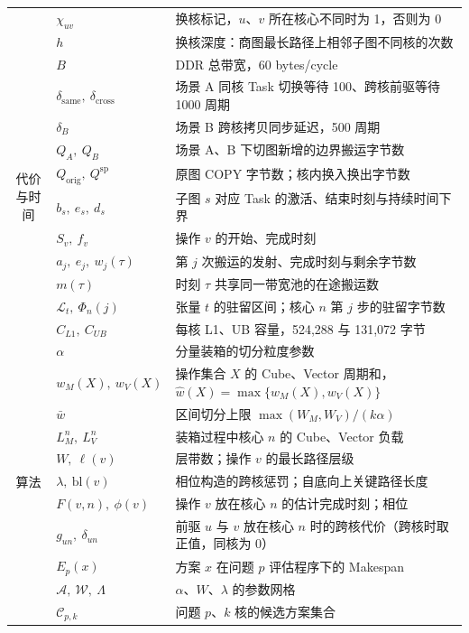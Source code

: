 \begin{footnotesize}
\begin{longtable}{c p{3.3cm} p{9.6cm}}
 & $\chi_{uv}$ & 换核标记，$u$、$v$ 所在核心不同时为 1，否则为 0 \\
 & $h$ & 换核深度：商图最长路径上相邻子图不同核的次数 \\
\midrule
\multirow{11}{*}{代价与时间}
 & $B$ & DDR 总带宽，60 bytes/cycle \\
 & $\delta_{\mathrm{same}},\ \delta_{\mathrm{cross}}$ & 场景 A 同核 Task 切换等待 100、跨核前驱等待 1000 周期 \\
 & $\delta_B$ & 场景 B 跨核拷贝同步延迟，500 周期 \\
 & $Q_A,\ Q_B$ & 场景 A、B 下切图新增的边界搬运字节数 \\
 & $Q_{\mathrm{orig}},\ Q^{\mathrm{sp}}$ & 原图 COPY 字节数；核内换入换出字节数 \\
 & $b_s,\ e_s,\ d_s$ & 子图 $s$ 对应 Task 的激活、结束时刻与持续时间下界 \\
 & $S_v,\ f_v$ & 操作 $v$ 的开始、完成时刻 \\
 & $a_j,\ e_j,\ w_j(\tau)$ & 第 $j$ 次搬运的发射、完成时刻与剩余字节数 \\
 & $m(\tau)$ & 时刻 $\tau$ 共享同一带宽池的在途搬运数 \\
 & $\mathcal{L}_t,\ \Phi_n(j)$ & 张量 $t$ 的驻留区间；核心 $n$ 第 $j$ 步的驻留字节数 \\
 & $C_{L1},\ C_{UB}$ & 每核 L1、UB 容量，524{,}288 与 131{,}072 字节 \\
\midrule
\multirow{12}{*}{算法}
 & $\alpha$ & 分量装箱的切分粒度参数 \\
 & $w_M(X),\ w_V(X)$ & 操作集合 $X$ 的 Cube、Vector 周期和，$\widehat w(X)=\max\{w_M(X),w_V(X)\}$ \\
 & $\bar w$ & 区间切分上限 $\max(W_M,W_V)/(k\alpha)$ \\
 & $L_M^n,\ L_V^n$ & 装箱过程中核心 $n$ 的 Cube、Vector 负载 \\
 & $W,\ \ell(v)$ & 层带数；操作 $v$ 的最长路径层级 \\
 & $\lambda,\ \mathrm{bl}(v)$ & 相位构造的跨核惩罚；自底向上关键路径长度 \\
 & $F(v,n),\ \phi(v)$ & 操作 $v$ 放在核心 $n$ 的估计完成时刻；相位 \\
 & $g_{un},\ \delta_{un}$ & 前驱 $u$ 与 $v$ 放在核心 $n$ 时的跨核代价（跨核时取正值，同核为 0） \\
 & $E_p(x)$ & 方案 $x$ 在问题 $p$ 评估程序下的 Makespan \\
 & $\mathcal{A},\ \mathcal{W},\ \Lambda$ & $\alpha$、$W$、$\lambda$ 的参数网格 \\
 & $\mathcal{C}_{p,k}$ & 问题 $p$、$k$ 核的候选方案集合 \\

\end{longtable}
\end{footnotesize}
